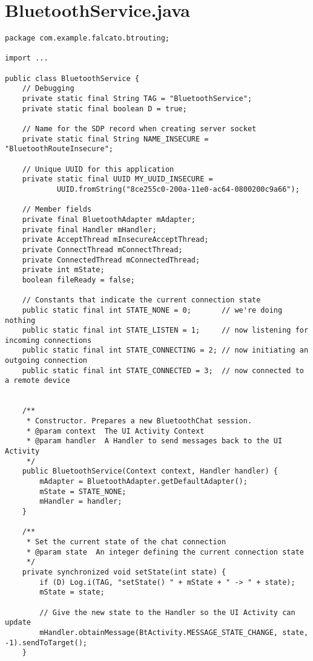 \section{BluetoothService.java}
\label{appendix:BluetoothService}

\begin{verbatim}
package com.example.falcato.btrouting;

import ...

public class BluetoothService {
    // Debugging
    private static final String TAG = "BluetoothService";
    private static final boolean D = true;

    // Name for the SDP record when creating server socket
    private static final String NAME_INSECURE = "BluetoothRouteInsecure";

    // Unique UUID for this application
    private static final UUID MY_UUID_INSECURE =
            UUID.fromString("8ce255c0-200a-11e0-ac64-0800200c9a66");

    // Member fields
    private final BluetoothAdapter mAdapter;
    private final Handler mHandler;
    private AcceptThread mInsecureAcceptThread;
    private ConnectThread mConnectThread;
    private ConnectedThread mConnectedThread;
    private int mState;
    boolean fileReady = false;

    // Constants that indicate the current connection state
    public static final int STATE_NONE = 0;       // we're doing nothing
    public static final int STATE_LISTEN = 1;     // now listening for incoming connections
    public static final int STATE_CONNECTING = 2; // now initiating an outgoing connection
    public static final int STATE_CONNECTED = 3;  // now connected to a remote device


    /**
     * Constructor. Prepares a new BluetoothChat session.
     * @param context  The UI Activity Context
     * @param handler  A Handler to send messages back to the UI Activity
     */
    public BluetoothService(Context context, Handler handler) {
        mAdapter = BluetoothAdapter.getDefaultAdapter();
        mState = STATE_NONE;
        mHandler = handler;
    }

    /**
     * Set the current state of the chat connection
     * @param state  An integer defining the current connection state
     */
    private synchronized void setState(int state) {
        if (D) Log.i(TAG, "setState() " + mState + " -> " + state);
        mState = state;

        // Give the new state to the Handler so the UI Activity can update
        mHandler.obtainMessage(BtActivity.MESSAGE_STATE_CHANGE, state, -1).sendToTarget();
    }


\end{verbatim}
